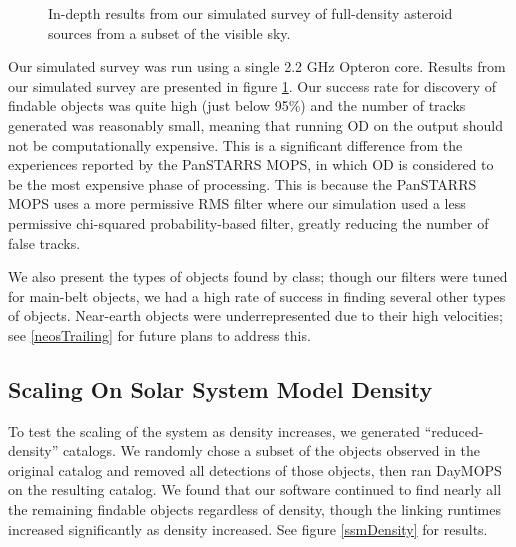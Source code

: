 \documentclass[12pt,preprint]{aastex}
\begin{document}
\begin{figure}[ht!]
\caption{In-depth results from our simulated survey of full-density asteroid sources from a subset of the visible sky.}
\label{bigSimResults}
\end{figure}

Our simulated survey was run using a single 2.2 GHz Opteron core.
Results from our simulated survey are presented in figure
\ref{bigSimResults}.  Our success rate for discovery of findable
objects was quite high (just below 95\%) and the number of tracks
generated was reasonably small, meaning that running OD on the output
should not be computationally expensive.  This is a significant
difference from the experiences reported by the PanSTARRS MOPS, in
which OD is considered to be the most expensive phase of processing.
This is because the PanSTARRS MOPS uses a more permissive RMS filter
where our simulation used a less permissive chi-squared
probability-based filter, greatly reducing the number of false tracks.

We also present the types of objects found by class; though our
filters were tuned for main-belt objects, we had a high rate of
success in finding several other types of objects.  Near-earth objects
were underrepresented due to their high velocities; see
\ref{neosTrailing} for future plans to address this.



\subsection{Scaling On Solar System Model Density}

To test the scaling of the system as density increases, we generated
``reduced-density'' catalogs.  We randomly chose a subset of the
objects observed in the original catalog and removed all detections of
those objects, then ran DayMOPS on the resulting catalog.  We found
that our software continued to find nearly all the remaining findable
objects regardless of density, though the linking runtimes increased
significantly as density increased. See figure \ref{ssmDensity} for
results.
\end{document}

